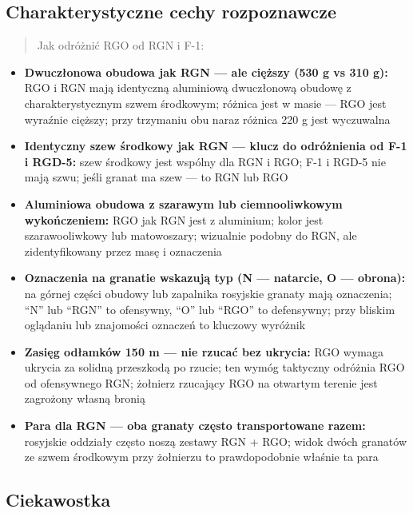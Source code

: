 \documentclass[12pt,oneside]{book}
\providecommand{\tightlist}{%
  \setlength{\itemsep}{0pt}\setlength{\parskip}{0pt}}
\begin{document}
\subsection{Charakterystyczne cechy
rozpoznawcze}\label{charakterystyczne-cechy-rozpoznawcze-119}

\begin{quote}
Jak odróżnić RGO od RGN i F-1:
\end{quote}

\begin{itemize}
\tightlist
\item
  \textbf{Dwuczłonowa obudowa jak RGN --- ale cięższy (530 g vs 310 g):}
  RGO i RGN mają identyczną aluminiową dwuczłonową obudowę z
  charakterystycznym szwem środkowym; różnica jest w masie --- RGO jest
  wyraźnie cięższy; przy trzymaniu obu naraz różnica 220 g jest
  wyczuwalna
\item
  \textbf{Identyczny szew środkowy jak RGN --- klucz do odróżnienia od
  F-1 i RGD-5:} szew środkowy jest wspólny dla RGN i RGO; F-1 i RGD-5
  nie mają szwu; jeśli granat ma szew --- to RGN lub RGO
\item
  \textbf{Aluminiowa obudowa z szarawym lub ciemnooliwkowym
  wykończeniem:} RGO jak RGN jest z aluminium; kolor jest
  szarawooliwkowy lub matowoszary; wizualnie podobny do RGN, ale
  zidentyfikowany przez masę i oznaczenia
\item
  \textbf{Oznaczenia na granatie wskazują typ (N --- natarcie, O ---
  obrona):} na górnej części obudowy lub zapalnika rosyjskie granaty
  mają oznaczenia; ``N'' lub ``RGN'' to ofensywny, ``O'' lub ``RGO'' to
  defensywny; przy bliskim oglądaniu lub znajomości oznaczeń to kluczowy
  wyróżnik
\item
  \textbf{Zasięg odłamków 150 m --- nie rzucać bez ukrycia:} RGO wymaga
  ukrycia za solidną przeszkodą po rzucie; ten wymóg taktyczny odróżnia
  RGO od ofensywnego RGN; żołnierz rzucający RGO na otwartym terenie
  jest zagrożony własną bronią
\item
  \textbf{Para dla RGN --- oba granaty często transportowane razem:}
  rosyjskie oddziały często noszą zestawy RGN + RGO; widok dwóch
  granatów ze szwem środkowym przy żołnierzu to prawdopodobnie właśnie
  ta para
\end{itemize}

\subsection{Ciekawostka}\label{ciekawostka-119}
\end{document}
